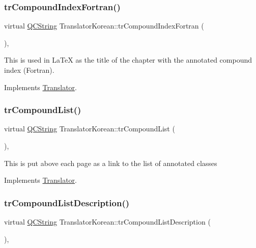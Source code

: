 \subsubsection{\texorpdfstring{trCompoundIndexFortran()}{trCompoundIndexFortran()}}
{\footnotesize\ttfamily virtual \mbox{\hyperlink{class_q_c_string}{Q\+C\+String}} Translator\+Korean\+::tr\+Compound\+Index\+Fortran (\begin{DoxyParamCaption}{ }\end{DoxyParamCaption})\hspace{0.3cm}{\ttfamily [inline]}, {\ttfamily [virtual]}}

This is used in La\+TeX as the title of the chapter with the annotated compound index (Fortran). 

Implements \mbox{\hyperlink{class_translator}{Translator}}.

\mbox{\label{class_translator_korean_a7fabb7366451101d44b8991b82d4aeef}} 
\subsubsection{\texorpdfstring{trCompoundList()}{trCompoundList()}}
{\footnotesize\ttfamily virtual \mbox{\hyperlink{class_q_c_string}{Q\+C\+String}} Translator\+Korean\+::tr\+Compound\+List (\begin{DoxyParamCaption}{ }\end{DoxyParamCaption})\hspace{0.3cm}{\ttfamily [inline]}, {\ttfamily [virtual]}}

This is put above each page as a link to the list of annotated classes 

Implements \mbox{\hyperlink{class_translator}{Translator}}.

\mbox{\label{class_translator_korean_ad0fda6b27e9c8eb58deaa2f9f8143088}} 
\subsubsection{\texorpdfstring{trCompoundListDescription()}{trCompoundListDescription()}}
{\footnotesize\ttfamily virtual \mbox{\hyperlink{class_q_c_string}{Q\+C\+String}} Translator\+Korean\+::tr\+Compound\+List\+Description (\begin{DoxyParamCaption}{ }\end{DoxyParamCaption})\hspace{0.3cm}{\ttfamily [inline]}, {\ttfamily [virtual]}}

